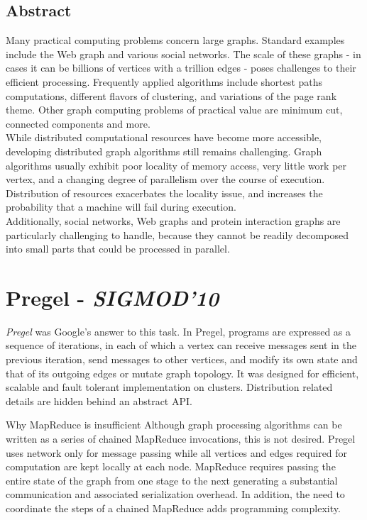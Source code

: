 \documentclass[letterpaper,twocolumn,10pt]{article}
\begin{document}
\subsection*{Abstract}
Many practical computing problems concern large graphs. Standard examples include the Web graph and various social networks. The scale of these graphs - in cases it can be billions of vertices with a trillion edges - poses challenges to their efficient processing.
Frequently applied algorithms include shortest paths computations, different flavors of clustering, and variations of the page rank theme. Other graph computing problems of practical value are minimum cut, connected components and more.\\
While distributed computational resources have become more accessible, developing distributed graph algorithms still remains challenging.
Graph algorithms usually exhibit poor locality of memory access, very little work per vertex, and a changing degree of parallelism over the course of execution. Distribution of resources exacerbates the locality issue, and increases the probability that a machine 
will fail during execution.\\
Additionally, social networks, Web graphs and protein interaction graphs are particularly challenging to handle, because they cannot be readily decomposed into small parts that could be processed in parallel.



\section{Pregel - \textit{SIGMOD'10}}
\textit{Pregel} was Google's answer to this task. In Pregel, programs are expressed as a sequence of iterations, in each of which a vertex can receive messages sent in the previous iteration, send messages to other vertices, and modify its own state and that of its outgoing edges or mutate graph topology. It was designed for efficient, scalable and fault tolerant implementation on clusters. Distribution related details are hidden behind an abstract API.

Why MapReduce is insufficient
Although graph processing algorithms can be written as a series of chained MapReduce invocations, this is not desired. Pregel uses network only for message passing while all vertices and edges required for computation are kept locally at each node. MapReduce requires passing the entire state of the graph from one stage to the next generating a substantial communication and associated serialization overhead. In addition, the need to coordinate the steps of a chained MapReduce adds programming complexity.
\end{document}
